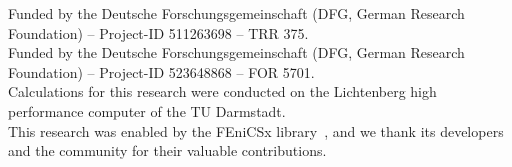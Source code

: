 \documentclass[pamm,a4paper,fleqn]{w-art}
\begin{document}
\begin{acknowledgement}

Funded by the Deutsche Forschungsgemeinschaft (DFG, German Research
Foundation) -- Project-ID 511263698 -- TRR 375.\\
Funded by the Deutsche Forschungsgemeinschaft (DFG, German Research
Foundation) -- Project-ID 523648868 -- FOR 5701.\\
Calculations for this research were conducted on the Lichtenberg high
performance computer of the TU Darmstadt.\\
This research was enabled by the FEniCSx library~\cite{_fenicsx_},
and we thank its developers and the community for their valuable
contributions.
\end{acknowledgement}



\end{document}
